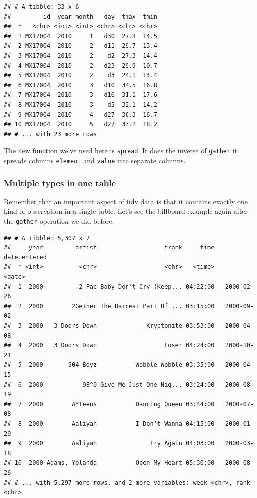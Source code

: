 \documentclass[]{article}
\newenvironment{Shaded}{\begin{snugshade}}{\end{snugshade}}
\newcommand{\KeywordTok}[1]{\textcolor[rgb]{0.13,0.29,0.53}{\textbf{{#1}}}}
\newcommand{\DataTypeTok}[1]{\textcolor[rgb]{0.13,0.29,0.53}{{#1}}}
\newcommand{\StringTok}[1]{\textcolor[rgb]{0.31,0.60,0.02}{{#1}}}
\newcommand{\OtherTok}[1]{\textcolor[rgb]{0.56,0.35,0.01}{{#1}}}
\newcommand{\NormalTok}[1]{{#1}}
\theoremstyle{definition}
\theoremstyle{definition}
\theoremstyle{remark}
\begin{document}
\begin{verbatim}
## # A tibble: 33 x 6
##         id  year month   day  tmax  tmin
##  *   <chr> <int> <int> <chr> <chr> <chr>
##  1 MX17004  2010     1   d30  27.8  14.5
##  2 MX17004  2010     2   d11  29.7  13.4
##  3 MX17004  2010     2    d2  27.3  14.4
##  4 MX17004  2010     2   d23  29.9  10.7
##  5 MX17004  2010     2    d3  24.1  14.4
##  6 MX17004  2010     3   d10  34.5  16.8
##  7 MX17004  2010     3   d16  31.1  17.6
##  8 MX17004  2010     3    d5  32.1  14.2
##  9 MX17004  2010     4   d27  36.3  16.7
## 10 MX17004  2010     5   d27  33.2  18.2
## # ... with 23 more rows
\end{verbatim}

The new function we've used here is \texttt{spread}. It does the inverse
of \texttt{gather} it spreads columns \texttt{element} and
\texttt{value} into separate columns.

\subsubsection{Multiple types in one
table}\label{multiple-types-in-one-table}

Remember that an important aspect of tidy data is that it contains
exactly one kind of observation in a single table. Let's see the
billboard example again after the \texttt{gather} operation we did
before:

\begin{Shaded}
\end{Shaded}

\begin{verbatim}
## # A tibble: 5,307 x 7
##     year         artist                   track     time date.entered
##  * <int>          <chr>                   <chr>   <time>       <date>
##  1  2000          2 Pac Baby Don't Cry (Keep... 04:22:00   2000-02-26
##  2  2000        2Ge+her The Hardest Part Of ... 03:15:00   2000-09-02
##  3  2000   3 Doors Down              Kryptonite 03:53:00   2000-04-08
##  4  2000   3 Doors Down                   Loser 04:24:00   2000-10-21
##  5  2000       504 Boyz           Wobble Wobble 03:35:00   2000-04-15
##  6  2000           98^0 Give Me Just One Nig... 03:24:00   2000-08-19
##  7  2000        A*Teens           Dancing Queen 03:44:00   2000-07-08
##  8  2000        Aaliyah           I Don't Wanna 04:15:00   2000-01-29
##  9  2000        Aaliyah               Try Again 04:03:00   2000-03-18
## 10  2000 Adams, Yolanda           Open My Heart 05:30:00   2000-08-26
## # ... with 5,297 more rows, and 2 more variables: week <chr>, rank <chr>
\end{verbatim}
\end{document}
